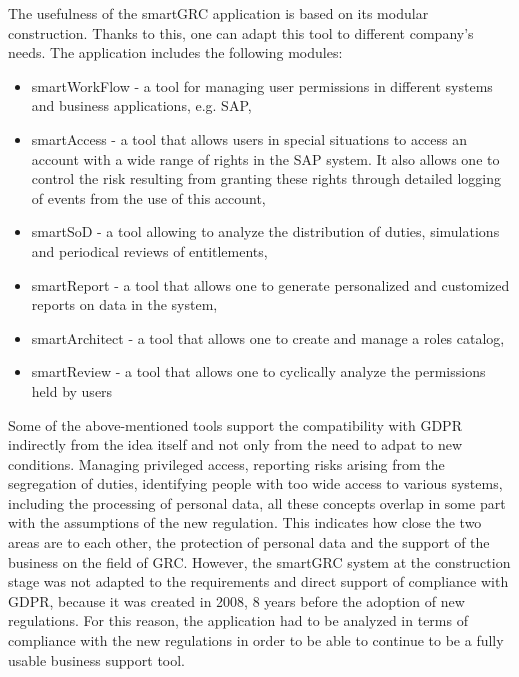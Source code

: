 \documentclass[en, noamssymb]{mgr}
\begin{document}
The usefulness of the smartGRC application is based on its modular construction. Thanks to this, one can adapt this tool to different company's needs. The application includes the following modules:

\begin{itemize}

\item smartWorkFlow - a tool for managing user permissions in different systems and business applications, e.g. SAP,

\item smartAccess - a tool that allows users in special situations to access an account with a wide range of rights in the SAP system. It also allows one to control the risk resulting from granting these rights through detailed logging of events from the use of this account,

\item smartSoD - a tool allowing to analyze the distribution of duties, simulations and periodical reviews of entitlements,

\item smartReport - a tool that allows one to generate personalized and customized reports on data in the system,

\item smartArchitect - a tool that allows one to create and manage a roles catalog,

\item smartReview - a tool that allows one to cyclically analyze the permissions held by users

\end{itemize}

Some of the above-mentioned tools support the compatibility with GDPR indirectly from the idea itself and not only from the need to adpat to new conditions. Managing privileged access, reporting risks arising from the segregation of duties, identifying people with too wide access to various systems, including the processing of personal data, all these concepts overlap in some part with the assumptions of the new regulation. This indicates how close the two areas are to each other, the protection of personal data and the support of the business on the field of GRC. However, the smartGRC system at the construction stage was not adapted to the requirements and direct support of compliance with GDPR, because it was created in 2008, 8 years before the adoption of new regulations. For this reason, the application had to be analyzed in terms of compliance with the new regulations in order to be able to continue to be a fully usable business support tool.
\end{document}
